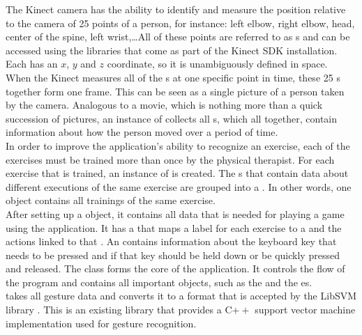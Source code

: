 The Kinect camera has the ability to identify and measure the position relative to the camera of 25 points of a person, for instance: left elbow, right elbow, head, center of the spine, left wrist,\ldots All of these points are referred to as s and can be accessed using the libraries that come as part of the Kinect SDK installation. Each  has an $x$, $y$ and $z$ coordinate, so it is unambiguously defined in space.\\

When the Kinect measures all of the s at one specific point in time, these 25 s together form one frame. This can be seen as a single picture of a person taken by the camera. Analogous to a movie, which is nothing more than a quick succession of pictures, an instance of  collects all s, which all together, contain information about how the person moved over a period of time.\\

In order to improve the application's ability to recognize an exercise, each of the exercises must be trained more than once by the physical therapist. For each exercise that is trained, an instance of  is created. The s that contain data about different executions of the same exercise are grouped into a . In other words, one  object contains all trainings of the same exercise.\\

After setting up a  object, it contains all data that is needed for playing a game using the application. It has a  that maps a label for each exercise to a  and the actions linked to that . An  contains information about the keyboard key that needs to be pressed and if that key should be held down or be quickly pressed and released. The  class forms the core of the application. It controls the flow of the program and contains all important objects, such as the  and the es.\\

 takes all gesture data and converts it to a format that is accepted by the LibSVM library \cite{LibSVM}. This is an existing library that provides a C$++$ support vector machine implementation used for gesture recognition.\\

